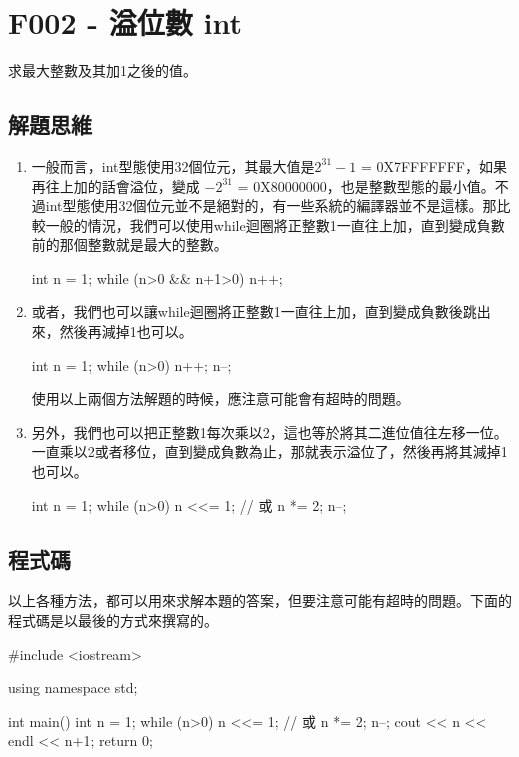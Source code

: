 \section{F002 - 溢位數 int}
求最大整數及其加1之後的值。

\subsection{解題思維}
\begin{enumerate}
	\item 一般而言，int型態使用32個位元，其最大值是$2^{31}-1$ = 0X7FFFFFFF，如果再往上加的話會溢位，變成 $-2^{31}$ = 0X80000000，也是整數型態的最小值。不過int型態使用32個位元並不是絕對的，有一些系統的編譯器並不是這樣。那比較一般的情況，我們可以使用while迴圈將正整數1一直往上加，直到變成負數前的那個整數就是最大的整數。
	\begin{inside}
		int n = 1;
		while (n>0 && n+1>0) n++;
	\end{inside}
	\item 或者，我們也可以讓while迴圈將正整數1一直往上加，直到變成負數後跳出來，然後再減掉1也可以。
	\begin{inside}
		int n = 1;
		while (n>0) n++;
		n--;
	\end{inside}
	使用以上兩個方法解題的時候，應注意可能會有超時的問題。
	\item 另外，我們也可以把正整數1每次乘以2，這也等於將其二進位值往左移一位。一直乘以2或者移位，直到變成負數為止，那就表示溢位了，然後再將其減掉1也可以。
	\begin{inside}
		int n = 1;
		while (n>0) n <<= 1; // 或 n *= 2;
		n--;
	\end{inside}
\end{enumerate}

\subsection{程式碼}
以上各種方法，都可以用來求解本題的答案，但要注意可能有超時的問題。下面的程式碼是以最後的方式來撰寫的。
\begin{cppcode}
#include <iostream>

using namespace std;

int main()
{
	int n = 1;
	while (n>0) n <<= 1; // 或 n *= 2;
	n--;
	cout << n << endl << n+1;
	return 0;
}
\end{cppcode}
